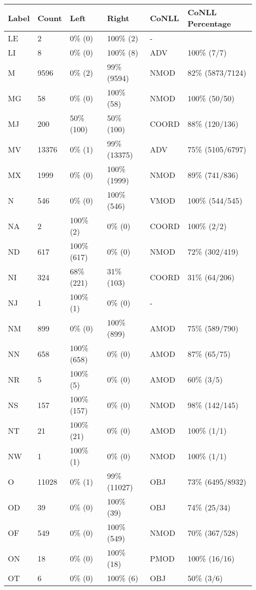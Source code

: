 \begin{figure*}
\begin{tabular}{|l|l|l|l||l|l|}
\hline
Label & Count & Left & Right & CoNLL & CoNLL Percentage\\ 
\hline
 LE & 2 & 0\% (0) & 100\% (2) & - &  \\ 
\hline
 LI & 8 & 0\% (0) & 100\% (8) & ADV & 100\% (7/7) \\ 
\hline
 M & 9596 & 0\% (2) & 99\% (9594) & NMOD & 82\% (5873/7124) \\ 
\hline
 MG & 58 & 0\% (0) & 100\% (58) & NMOD & 100\% (50/50) \\ 
\hline
 MJ & 200 & 50\% (100) & 50\% (100) & COORD & 88\% (120/136) \\ 
\hline
 MV & 13376 & 0\% (1) & 99\% (13375) & ADV & 75\% (5105/6797) \\ 
\hline
 MX & 1999 & 0\% (0) & 100\% (1999) & NMOD & 89\% (741/836) \\ 
\hline
 N & 546 & 0\% (0) & 100\% (546) & VMOD & 100\% (544/545) \\ 
\hline
 NA & 2 & 100\% (2) & 0\% (0) & COORD & 100\% (2/2) \\ 
\hline
 ND & 617 & 100\% (617) & 0\% (0) & NMOD & 72\% (302/419) \\ 
\hline
 NI & 324 & 68\% (221) & 31\% (103) & COORD & 31\% (64/206) \\ 
\hline
 NJ & 1 & 100\% (1) & 0\% (0) & - &  \\ 
\hline
 NM & 899 & 0\% (0) & 100\% (899) & AMOD & 75\% (589/790) \\ 
\hline
 NN & 658 & 100\% (658) & 0\% (0) & AMOD & 87\% (65/75) \\ 
\hline
 NR & 5 & 100\% (5) & 0\% (0) & AMOD & 60\% (3/5) \\ 
\hline
 NS & 157 & 100\% (157) & 0\% (0) & NMOD & 98\% (142/145) \\ 
\hline
 NT & 21 & 100\% (21) & 0\% (0) & AMOD & 100\% (1/1) \\ 
\hline
 NW & 1 & 100\% (1) & 0\% (0) & NMOD & 100\% (1/1) \\ 
\hline
 O & 11028 & 0\% (1) & 99\% (11027) & OBJ & 73\% (6495/8932) \\ 
\hline
 OD & 39 & 0\% (0) & 100\% (39) & OBJ & 74\% (25/34) \\ 
\hline
 OF & 549 & 0\% (0) & 100\% (549) & NMOD & 70\% (367/528) \\ 
\hline
 ON & 18 & 0\% (0) & 100\% (18) & PMOD & 100\% (16/16) \\ 
\hline
 OT & 6 & 0\% (0) & 100\% (6) & OBJ & 50\% (3/6) \\ 

\end{tabular}
\end{figure*}
